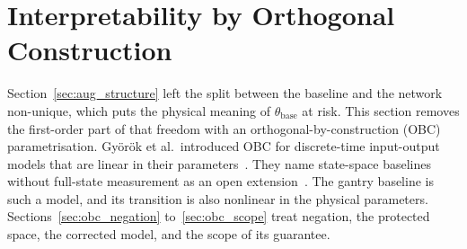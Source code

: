 \section{Interpretability by Orthogonal Construction}\label{sec:obc}

Section~\ref{sec:aug_structure} left the split between the baseline and the
network non-unique, which puts the physical meaning of
$\theta_{\mathrm{base}}$ at risk.
This section removes the first-order part of that freedom with an
orthogonal-by-construction (OBC) parametrisation.
Gy\"or\"ok et al.\ introduced OBC for discrete-time input-output models that
are linear in their parameters~\cite{gyorok2026obc}.
They name state-space baselines without full-state measurement as an open
extension~\cite[Sec.~6]{gyorok2026obc}.
The gantry baseline is such a model, and its transition is also nonlinear in
the physical parameters.
Sections~\ref{sec:obc_negation} to~\ref{sec:obc_scope} treat negation, the
protected space, the corrected model, and the scope of its guarantee.

